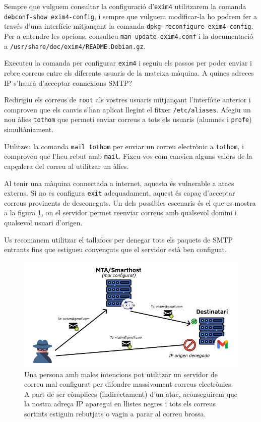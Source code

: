 \documentclass{practicaitic}
\begin{document}
Sempre que vulguem consultar la configuració d'\texttt{exim4} utilitzarem la
comanda \texttt{debconf-show exim4-config}, i sempre que vulguem modificar-la
ho podrem fer a través d'una interfície mitjançant la comanda
\texttt{dpkg-reconfigure exim4-config}. Per a entendre les opcions,
consulteu \texttt{man update-exim4.conf} i la documentació a
\texttt{/usr/share/doc/exim4/README.Debian.gz}.

\begin{tasca}
  Executeu la comanda per configurar \texttt{exim4} i seguiu els passos
  per poder enviar i rebre correus entre els diferents usuaris de la
  mateixa màquina. A quines adreces IP s'haurà d'acceptar connexions SMTP?

  Redirigiu els correus de \texttt{root} als vostres usuaris mitjançant
  l'interfície anterior i comproveu que els canvis s'han aplicat llegint el
  fitxer \texttt{/etc/aliases}. Afegiu un nou àlies \texttt{tothom} que
  permeti enviar correus a tots els usuaris (alumnes i \texttt{profe})
  simultàniament.

  Utilitzeu la comanda \texttt{mail tothom} per enviar un correu electrònic a
  \texttt{tothom}, i comproveu que l'heu rebut amb \texttt{mail}. Fixeu-vos
  com canvien alguns valors de la capçalera del correu al utilitzar un àlies.
\end{tasca}

\begin{tcolorbox}[
  title=Atenció,
  colback=red!10, colframe=red!50,
  rounded corners
]
Al tenir una màquina connectada a internet, aquesta és vulnerable a atacs
externs. Si no es configura \texttt{exit} adequadament, aquest és capaç
d'acceptar correus provinents de desconeguts. Un dels possibles escenaris
és el que es mostra a la figura \ref{fig:escenari-malicios}, on el servidor
permet reenviar correus amb qualsevol domini i qualsevol usuari d'origen.
\newline

Us recomanem utilitzar el tallafocs per denegar tots els paquets de SMTP
entrants fins que estigueu convençuts que el servidor està ben configuat.
\end{tcolorbox}

\begin{figure}[h]
  \includegraphics[width=0.6\linewidth]{assets/p4-escenari-malicios.png}
  \centering
  \caption{
    Una persona amb males intencions pot utilitzar un servidor de correu
    mal configurat per difondre massivament correus electrònics. A part de
    ser còmplices (indirectament) d'un atac, aconseguirem que la nostra adreça
    IP aparegui en llistes negres i tots els correus sortints estiguin rebutjats
    o vagin a parar al correu brossa.
    }
  \label{fig:escenari-malicios}
\end{figure}
\end{document}
